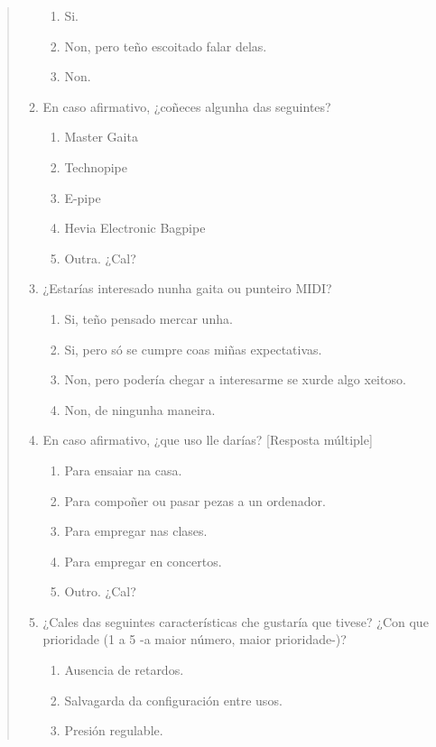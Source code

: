 \begin{quotation}
\begin{enumerate}
        \begin{enumerate}
         \item Si.
         \item Non, pero teño escoitado falar delas.
         \item Non.
        \end{enumerate}
  \item En caso afirmativo, ¿coñeces algunha das seguintes?
        \begin{enumerate}
         \item Master Gaita
         \item Technopipe
         \item E-pipe
         \item Hevia Electronic Bagpipe
         \item Outra. ¿Cal?
        \end{enumerate}
  \item ¿Estarías interesado nunha gaita ou punteiro MIDI?
        \begin{enumerate}
         \item Si, teño pensado mercar unha.
         \item Si, pero só se cumpre coas miñas expectativas.
         \item Non, pero podería chegar a interesarme se xurde algo xeitoso.
         \item Non, de ningunha maneira.
        \end{enumerate}
  \item En caso afirmativo, ¿que uso lle darías? [Resposta múltiple]
        \begin{enumerate}
         \item Para ensaiar na casa.
         \item Para compoñer ou pasar pezas a un ordenador.
         \item Para empregar nas clases.
         \item Para empregar en concertos.
         \item Outro. ¿Cal?
        \end{enumerate}
  \item ¿Cales das seguintes características che gustaría que tivese? ¿Con que
        prioridade (1 a 5 -a maior número, maior prioridade-)?
        \begin{enumerate}
         \item Ausencia de retardos.
         \item Salvagarda da configuración entre usos.
         \item Presión regulable.

\end{enumerate}
\end{enumerate}
\end{quotation}
